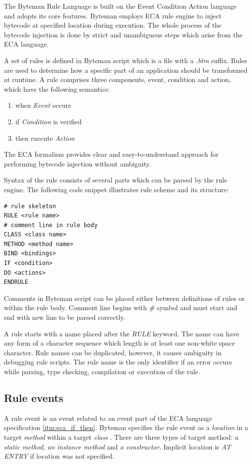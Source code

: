 \documentclass[12pt,oneside]{fithesis2}
\begin{document}
The Byteman Rule Language is built on the Event Condition Action language and adopts its core features. Byteman employs ECA rule engine to inject bytecode at specified location during execution. The whole process of the bytecode injection is done by strict and unambiguous steps which arise from the ECA language.

A set of rules is defined in Byteman script which is a file with a \textit{.btm} suffix. Rules are used to determine how a specific part of an application should be transformed at runtime. A rule comprises three components, event, condition and action, which have the following semantics\cite{eca}:

\begin{enumerate}
\label{itm:eca_if_then}
   \item when \textit{Event} occurs
   \item if \textit{Condition} is verified
   \item then execute \textit{Action}
\end{enumerate}

The ECA formalism provides clear and easy-to-understand approach for performing bytecode injection without ambiguity.

Syntax of the rule consists of several parts which can be parsed by the rule engine. The following code snippet illustrates rule scheme and its structure:

\begin{lstlisting}[caption = Byteman rule scheme \cite{byteman_doc}, label = byteman_scheme]
# rule skeleton
RULE <rule name>
# comment line in rule body
CLASS <class name>
METHOD <method name>
BIND <bindings>
IF <condition>
DO <actions>
ENDRULE
\end{lstlisting}

Comments in Byteman script can be placed either between definitions of rules or within the rule body. Comment line begins with \textit{\#} symbol and must start and end with new line to be parsed correctly.

A rule starts with a name placed after the \textit{RULE} keyword. The name can have any form of a character sequence which length is at least one non-white space character. Rule names can be duplicated, however, it causes ambiguity in debugging rule scripts. The rule name is the only identifier if an error occurs while parsing, type checking, compilation or execution of the rule.

\subsection{Rule events}
\label{subsec:rule_events}
A rule event is an event related to an event part of the ECA language specification \ref{itm:eca_if_then}. Byteman specifies the rule event as a \textit{location} in a target \textit{method} within a target \textit{class} \cite[Rule Events]{byteman_doc}. There are three types of target method: \textit{a static method}, \textit{an instance method} and \textit{a constructor}. Implicit location is \textit{AT ENTRY} if location was not specified.
\end{document}
